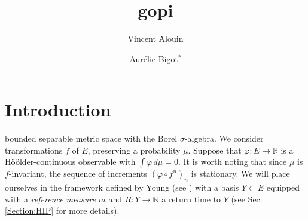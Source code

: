 \documentclass{ws-sd}
\title{gopi}
\date{ }
\author{Vincent Alouin}
\author{Aur\'elie Bigot$^{\ast}$}
\newcommand{\R}{\mathbb{R}}
\begin{document}
\maketitle

{\let\thefootnote\relax{}}

\begin{history}
\end{history}



\section{Introduction}
    \label{Section:intro}

bounded separable metric space with the Borel $\sigma$-algebra. We consider transformations $f$ of $E$, preserving a probability $\mu$. Suppose that $\varphi : E \to \R$ is a Hö\"older-continuous observable with $\int \varphi \, d\mu = 0$. It is worth noting that since $\mu$ is $f$-invariant, the sequence of increments $(\varphi \circ f^n)_n$ is stationary. We will place ourselves in the framework defined by Young (see \cite{27}) with  a basis $Y \subset E$ equipped with a \textit{reference measure} $m$ and $R : Y \to \mathbb N$ a return time to $Y$ (see Sec. \ref{Section:HIP} for more details).
\\
\end{document}
